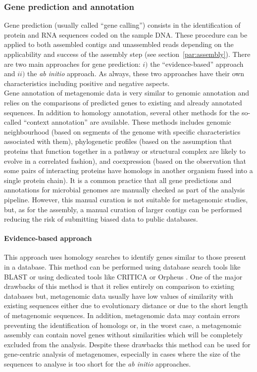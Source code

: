 \subsubsection{Gene prediction and annotation}
Gene prediction (usually called ``gene calling'') consists in the identification of protein and RNA sequences coded on the sample DNA. These procedure can be applied to both assembled contigs and unassembled reads depending on the applicability and success of the assembly step (see section~\ref{par:assembly}). There are two main approaches for gene prediction: $i)$ the ``evidence-based'' approach and $ii)$ the \textit{ab initio} approach. As always, these two approaches have their own characteristics including positive and negative aspects.\\
Gene annotation of metagenomic data is very similar to genomic annotation and relies on the comparisons of predicted genes to existing and already annotated sequences. In addition to homology annotation, several other methods for the so-called ``context annotation'' are available. These methods includes genomic neighbourhood \cite{dandekar1998conservation} (based on segments of the genome with specific characteristics associated with them), phylogenetic profiles \cite{pellegrini1999assigning} (based on the assumption that proteins that function together in a pathway or structural complex are likely to evolve in a correlated fashion), and coexpression \cite{marcotte1999detecting} (based on the observation that some pairs of interacting proteins have homologs in another organism fused into a single protein chain). It is a common practice that all gene predictions and annotations   for microbial genomes are manually checked as part of the analysis pipeline. However, this manual curation is not suitable for metagenomic studies, but, as for the assembly, a manual curation of larger contigs can be performed reducing the risk of submitting biased data to public databases.\\

\paragraph{Evidence-based approach}
This approach uses homology searches to identify genes similar to those present in a database. This method can be performed using database search tools like BLAST \cite{altschul1990basic} or using dedicated tools like CRITICA \cite{badger1999critica} or Orpheus \cite{frishman1998combining}. One of the major drawbacks of this method is that it relies entirely on comparison to existing databases but, metagenomic data usually have low values of similarity with existing sequences either due to evolutionary distance or due to the short length of metagenomic sequences. In addition, metagenomic data may contain errors preventing the identification of homologs or, in the worst case, a metagenomic assembly can contain novel genes without similarities which will be completely excluded from the analysis. Despite these drawbacks this method can be used for gene-centric analysis of metagenomes, especially in cases where the size of the sequences to analyse is too short for the \textit{ab initio} approaches.\\%

